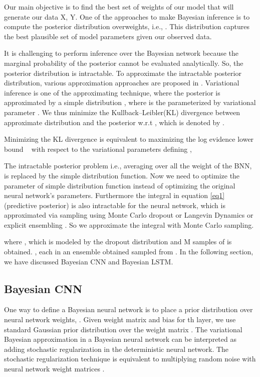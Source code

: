\documentclass[review]{elsarticle}
\begin{document}
Our main objective is to find the best set of weights of our model that will generate our data X, Y. One of the approaches to make Bayesian inference is to compute the posterior distribution overweights, i.e., . This distribution captures the best plausible set of model parameters given our observed data. 

It is challenging to perform inference over the Bayesian network because the marginal probability  of the posterior cannot be evaluated analytically. So, the posterior  distribution  is  intractable. To approximate  the  intractable posterior distribution, various approximation approaches are proposed in \cite{Bishop_Springer2006,Gal_ICML2016,Blundell_ARX2015}. Variational inference is one of the approximating technique, where the posterior  is approximated by a simple distribution , where  is the parameterized by variational parameter .  We thus minimize the Kullback–Leibler(KL) divergence between approximate distribution  and the posterior  w.r.t , which is denoted by . 


Minimizing the KL divergence is equivalent to maximizing the log evidence lower bound ~\cite{Bishop_Springer2006} with respect to the variational parameters defining ,

The intractable posterior problem i.e., averaging over all the weight of the BNN, is replaced by the simple distribution function. Now we need to optimize the parameter of simple distribution function instead of optimizing the original neural network's parameters. Furthermore the integral in equation \ref{eq1} (predictive posterior) is also intractable for the neural network, which is approximated via sampling using Monte Carlo dropout \cite{Gal_ICML2016} or Langevin Dynamics \cite{welling_ICML2011bayesian} or explicit ensembling \cite{lakshminarayanan_NIPS2017simple}. So we approximate the integral with Monte Carlo sampling.

where , which is modeled by the dropout distribution and M samples of  is obtained.
, each  in an ensemble  obtained sampled from .
In the following section, we have discussed Bayesian CNN and Bayesian LSTM.
\subsection{Bayesian CNN }
One way to define a Bayesian neural network \cite{Gal_ICML2016} is to place a prior distribution over neural network weights, . Given weight matrix  and bias  for th layer, we use standard Gaussian prior distribution over the weight matrix . The variational Bayesian approximation in a Bayesian neural network can be interpreted as adding stochastic regularization in the deterministic neural network. The stochastic regularization technique is equivalent to multiplying random noise  with neural network weight matrices .
\end{document}
